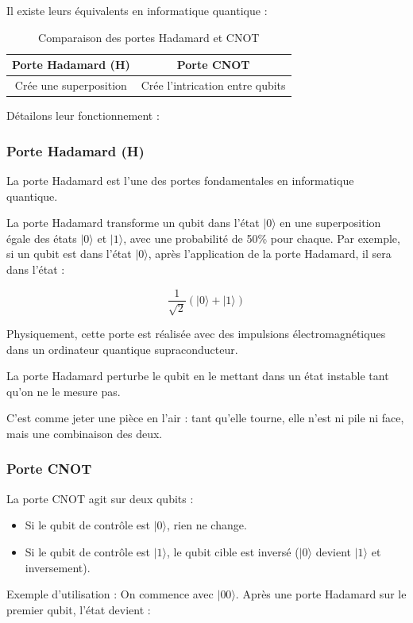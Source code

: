 \documentclass{article}
\begin{document}
Il existe leurs équivalents en informatique quantique :
\begin{table}[H]
\centering
\begin{tabular}{|c|c|}
  \hline
  \textbf{Porte Hadamard (H)} & \textbf{Porte CNOT} \\
  \hline
  Crée une superposition & Crée l’intrication entre qubits \\
  \hline
\end{tabular}
\caption{Comparaison des portes Hadamard et CNOT}
\end{table}

Détailons leur fonctionnement :

\subsubsection{Porte Hadamard (H)}

La porte Hadamard est l’une des portes fondamentales en informatique quantique.

La porte Hadamard transforme un qubit dans l’état $|0\rangle$ en une superposition égale des états $|0\rangle$ et $|1\rangle$, avec une probabilité de 50\% pour chaque. Par exemple, si un qubit est dans l'état $|0\rangle$, après l'application de la porte Hadamard, il sera dans l'état :

\[ \frac{1}{\sqrt{2}}(|0\rangle + |1\rangle) \]

Physiquement, cette porte est réalisée avec des impulsions électromagnétiques dans un ordinateur quantique supraconducteur.

La porte Hadamard perturbe le qubit en le mettant dans un état instable tant qu’on ne le mesure pas.

C’est comme jeter une pièce en l’air : tant qu’elle tourne, elle n’est ni pile ni face, mais une combinaison des deux.

\subsubsection{Porte CNOT}

La porte CNOT agit sur deux qubits :
\medskip
\begin{itemize}
    \item Si le qubit de contrôle est $|0\rangle$, rien ne change.
    \item Si le qubit de contrôle est $|1\rangle$, le qubit cible est inversé ($|0\rangle$ devient $|1\rangle$ et inversement).
\end{itemize}
\medskip
Exemple d’utilisation :
\medskip
On commence avec $|00\rangle$. Après une porte Hadamard sur le premier qubit, l’état devient :
\end{document}
